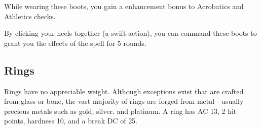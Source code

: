  While wearing these boots, you gain a  enhancement bonus to Acrobatics and Athletics checks.


 By clicking your heels together (a swift action), you can command these boots to grant you the effects of the  spell for 5 rounds.


\subsection{Rings}

 Rings have no appreciable weight. Although exceptions exist that are crafted from glass or bone, the vast majority of rings are forged from metal - usually precious metals such as gold, silver, and platinum. A ring has AC 13, 2 hit points, hardness 10, and a break DC of 25.

\begin{comment}
\begin{dtable}
\lcaption{Rings}
\begin{tabularx}{\columnwidth}{>{\lcol}X l}
Ring & Market Price \\
Protection \plus1 & 2,000 gp \\
Feather falling & 2,200 gp \\
Climbing & 2,500 gp \\
Jumping & 2,500 gp \\
Sustenance & 2,500 gp \\
Swimming & 2,500 gp \\
Mind shielding & 8,000 gp \\
Protection \plus2 & 8,000 gp \\
Climbing, improved & 10,000 gp \\
Jumping, improved & 10,000 gp \\
Swimming, improved & 10,000 gp \\
Energy resistance, minor & 12,000 gp \\
Protection \plus3 & 18,000 gp \\
Energy resistance, major & 28,000 gp \\
Protection \plus4 & 32,000 gp \\
Energy resistance, greater & 44,000 gp \\
Protection \plus5 & 50,000 gp \\
\end{tabularx}
\end{dtable}
\end{comment}

